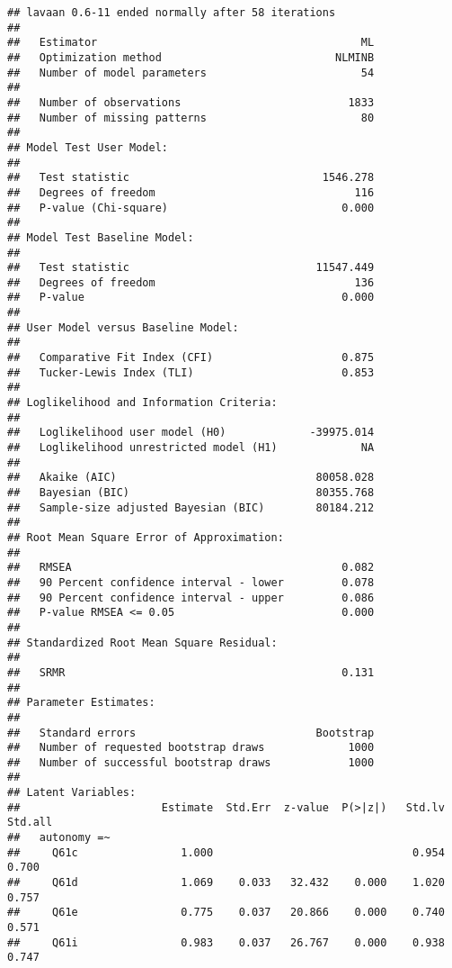 \documentclass[
]{article}
\begin{document}
\begin{verbatim}
## lavaan 0.6-11 ended normally after 58 iterations
## 
##   Estimator                                         ML
##   Optimization method                           NLMINB
##   Number of model parameters                        54
##                                                       
##   Number of observations                          1833
##   Number of missing patterns                        80
##                                                       
## Model Test User Model:
##                                                       
##   Test statistic                              1546.278
##   Degrees of freedom                               116
##   P-value (Chi-square)                           0.000
## 
## Model Test Baseline Model:
## 
##   Test statistic                             11547.449
##   Degrees of freedom                               136
##   P-value                                        0.000
## 
## User Model versus Baseline Model:
## 
##   Comparative Fit Index (CFI)                    0.875
##   Tucker-Lewis Index (TLI)                       0.853
## 
## Loglikelihood and Information Criteria:
## 
##   Loglikelihood user model (H0)             -39975.014
##   Loglikelihood unrestricted model (H1)             NA
##                                                       
##   Akaike (AIC)                               80058.028
##   Bayesian (BIC)                             80355.768
##   Sample-size adjusted Bayesian (BIC)        80184.212
## 
## Root Mean Square Error of Approximation:
## 
##   RMSEA                                          0.082
##   90 Percent confidence interval - lower         0.078
##   90 Percent confidence interval - upper         0.086
##   P-value RMSEA <= 0.05                          0.000
## 
## Standardized Root Mean Square Residual:
## 
##   SRMR                                           0.131
## 
## Parameter Estimates:
## 
##   Standard errors                            Bootstrap
##   Number of requested bootstrap draws             1000
##   Number of successful bootstrap draws            1000
## 
## Latent Variables:
##                      Estimate  Std.Err  z-value  P(>|z|)   Std.lv  Std.all
##   autonomy =~                                                             
##     Q61c                1.000                               0.954    0.700
##     Q61d                1.069    0.033   32.432    0.000    1.020    0.757
##     Q61e                0.775    0.037   20.866    0.000    0.740    0.571
##     Q61i                0.983    0.037   26.767    0.000    0.938    0.747

\end{verbatim}
\end{document}
